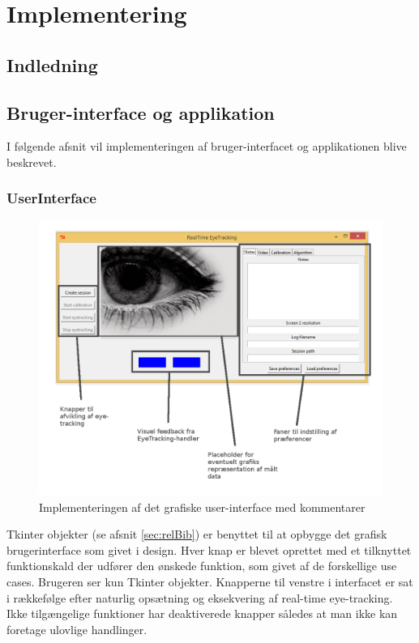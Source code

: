 \documentclass[rapport.tex]{subfiles}
\begin{document}
\section{Implementering}
	\subsection{Indledning}
	\subsection{Bruger-interface og applikation}
	I følgende afsnit vil implementeringen af bruger-interfacet og applikationen blive beskrevet. 
	

	\subsubsection{UserInterface}

	\begin{figure}
	\centering
	\includegraphics[width=0.9\linewidth]{GUIkommentare}
	\caption[Implementering af GUI]{Implementeringen af det grafiske user-interface med kommentarer}
	\label{fig:GUIkommentare}
	\end{figure}
	
	Tkinter objekter (se afsnit \ref{sec:relBib}) er benyttet til at opbygge det grafisk brugerinterface som givet i design. 
	Hver knap er blevet oprettet med et tilknyttet funktionskald der udfører den ønskede funktion, som givet af de forskellige use cases. 
	Brugeren ser kun Tkinter objekter. 
	Knapperne til venstre i interfacet er sat i rækkefølge efter naturlig opsætning og eksekvering af real-time eye-tracking. Ikke tilgængelige funktioner har deaktiverede knapper således at man ikke kan foretage ulovlige handlinger. \\
	
\end{document}
